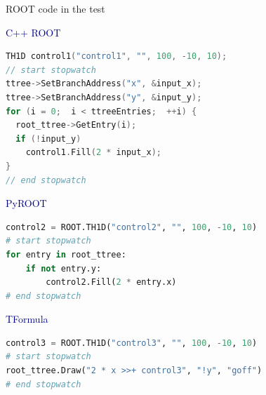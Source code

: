 \documentclass{beamer}
\begin{document}
\begin{frame}[fragile]{ROOT code in the test}

\vspace{0.3 cm}
\hfill \textcolor{darkblue}{C++ ROOT}

\vspace{-0.5 cm}
\begin{minipage}{0.8\linewidth}
\begin{lstlisting}[language=cpp]
TH1D control1("control1", "", 100, -10, 10);
// start stopwatch
ttree->SetBranchAddress("x", &input_x);
ttree->SetBranchAddress("y", &input_y);
for (i = 0;  i < ttreeEntries;  ++i) {
  root_ttree->GetEntry(i);
  if (!input_y)
    control1.Fill(2 * input_x);
}
// end stopwatch
\end{lstlisting}
\end{minipage}

\hfill \textcolor{darkblue}{PyROOT}

\vspace{-0.5 cm}
\begin{minipage}{0.8\linewidth}
\begin{lstlisting}[language=python]
control2 = ROOT.TH1D("control2", "", 100, -10, 10)
# start stopwatch
for entry in root_ttree:
    if not entry.y:
        control2.Fill(2 * entry.x)
# end stopwatch
\end{lstlisting}
\end{minipage}

\hfill \textcolor{darkblue}{TFormula}

\vspace{-0.5 cm}
\begin{minipage}{0.8\linewidth}
\begin{lstlisting}[language=python]
control3 = ROOT.TH1D("control3", "", 100, -10, 10)
# start stopwatch
root_ttree.Draw("2 * x >>+ control3", "!y", "goff")
# end stopwatch
\end{lstlisting}
\end{minipage}
\end{frame}
\end{document}
